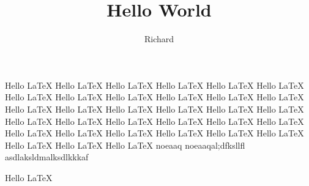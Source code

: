 \documentclass{article}
\title{Hello World}
\author{Richard}
\begin{document}
    \maketitle
    
    Hello \LaTeX
    Hello \LaTeX
    Hello \LaTeX
    Hello \LaTeX
    Hello \LaTeX
    Hello \LaTeX
    Hello \LaTeX
    Hello \LaTeX
    Hello \LaTeX
    Hello \LaTeX
    Hello \LaTeX
    Hello \LaTeX
    Hello \LaTeX
    Hello \LaTeX
    Hello \LaTeX
    Hello \LaTeX
    Hello \LaTeX
    Hello \LaTeX
    Hello \LaTeX
    Hello \LaTeX
    Hello \LaTeX
    Hello \LaTeX
    Hello \LaTeX
    Hello \LaTeX
    Hello \LaTeX
    Hello \LaTeX
    Hello \LaTeX
    Hello \LaTeX
    Hello \LaTeX
    Hello \LaTeX
    Hello \LaTeX
    Hello \LaTeX
    Hello \LaTeX
    noeaaq
    noeaaqal;dfksllfl
    asdlaksldmalksdlkkkaf
    
    Hello \LaTeX
    
    
\end{document}
